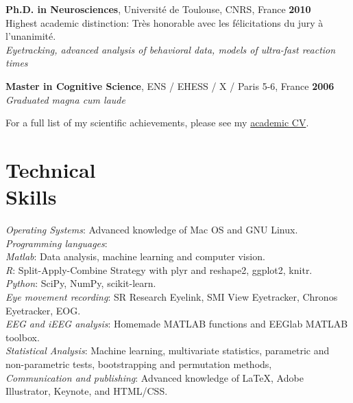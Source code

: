 \documentclass[margin,line]{resume}
\begin{document}
\begin{resume}
	\vspace{-1.5mm}	
         \textbf{Ph.D. in Neurosciences}, Université de Toulouse, CNRS, France \hfill \textbf{2010}\\
	Highest academic distinction: Très honorable avec les félicitations du jury à l'unanimité.\\
	\textsl{Eyetracking, advanced analysis of behavioral data, models of ultra-fast reaction times}
	
	\vspace{-1.5mm}
	\textbf{Master in Cognitive Science}, ENS / EHESS / X / Paris 5-6, France  \hfill \textbf{2006}\\
	\textsl{Graduated magna cum laude}
	
	\vspace{-1.5mm}
	For a full list of my scientific achievements, please see my \href{http://scrouzet.github.io/cv/CVSebastienCrouzet.pdf}{academic CV}.
	
	
\newpage

\vspace{3mm}
    \section{\mysidestyle Technical\\Skills}

	\textsl{Operating Systems}: Advanced knowledge of Mac OS and GNU Linux.\\
	\textsl{Programming languages}: \\
		\phantom{1em} \textsl{Matlab}: Data analysis, machine learning and computer vision.\\
		\phantom{1em} \textsl{R}: Split-Apply-Combine Strategy with plyr and reshape2, ggplot2, knitr.\\
		\phantom{1em} \textsl{Python}: SciPy, NumPy, scikit-learn.\\
	\textsl{Eye movement recording}: SR Research Eyelink, SMI View Eyetracker, Chronos Eyetracker, EOG.\\
	\textsl{EEG and iEEG analysis}: Homemade MATLAB functions and EEGlab MATLAB toolbox.\\
	\textsl{Statistical Analysis}: Machine learning, multivariate statistics, parametric and non-parametric tests, bootstrapping and permutation methods, \\
	\textsl{Communication and publishing}: Advanced knowledge of \LaTeX, Adobe Illustrator, Keynote, and HTML/CSS.




\end{resume}
\end{document}
